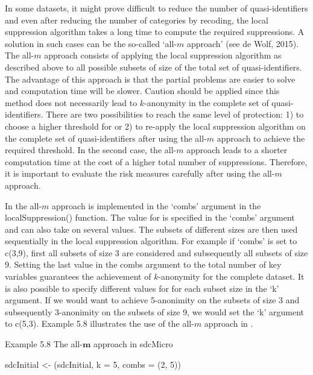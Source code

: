 \documentclass[letterpaper,10pt,english]{sphinxmanual}
\begin{document}
In some datasets, it might prove difficult to reduce the number of
quasi-identifiers and even after reducing the number of categories by
recoding, the local suppression algorithm takes a long time to compute
the required suppressions. A solution in such cases can be the so-called
‘all-\(m\) approach’ (see de Wolf, 2015). The all-\(m\)
approach consists of applying the local suppression algorithm as
described above to all possible subsets of size  of the total set of
quasi-identifiers. The advantage of this approach is that the partial
problems are easier to solve and computation time will be slower.
Caution should be applied since this method does not necessarily lead to
\(k\)-anonymity in the complete set of quasi-identifiers. There are
two possibilities to reach the same level of protection: 1) to choose a
higher threshold for  or 2) to re-apply the local suppression
algorithm on the complete set of quasi-identifiers after using the
all-\(m\) approach to achieve the required threshold. In the
second case, the all-\(m\) approach leads to a shorter computation
time at the cost of a higher total number of suppressions.  Therefore, it is
important to evaluate the risk measures carefully after using the
all-\(m\) approach.

In  the all-\(m\) approach is implemented in the ‘combs’
argument in the localSuppression() function. The value for  is
specified in the ‘combs’ argument and can also take on several values.
The subsets of different sizes are then used sequentially in the local
suppression algorithm. For example if ‘combs’ is set to c(3,9), first
all subsets of size 3 are considered and subsequently all subsets of
size 9. Setting the last value in the combs argument to the total number
of key variables guarantees the achievement of \(k\)-anonymity for
the complete dataset. It is also possible to specify different values
for  for each subset size in the ‘k’ argument. If we would want to
achieve 5-anonimity on the subsets of size 3 and subsequently
3-anonimity on the subsets of size 9, we would set the ‘k’ argument to
c(5,3). Example 5.8 illustrates the use of the all-\(m\) approach
in .

Example 5.8 The all-\(\mathbf{m}\) approach in sdcMicro

\begin{DUlineblock}{0em}
\item[] 
\item[] sdcInitial \textless{}- (sdcInitial, k = 5, combs =
(2, 5))
\end{DUlineblock}
\end{document}
